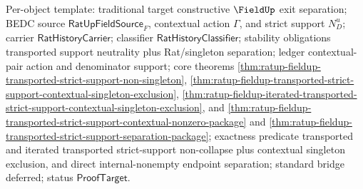 Per-object template: traditional target constructive $\FieldUp$ exit separation;
BEDC source $\mathsf{RatUpFieldSource}_F$, contextual action $\Gamma$, and
strict support $N_D^u$; carrier $\mathsf{RatHistoryCarrier}$; classifier
$\mathsf{RatHistoryClassifier}$; stability obligations transported support
neutrality plus Rat/singleton separation; ledger contextual-pair action and
denominator support; core theorems
\autoref{thm:ratup-fieldup-transported-strict-support-non-singleton},
\autoref{thm:ratup-fieldup-transported-strict-support-contextual-singleton-exclusion},
\autoref{thm:ratup-fieldup-iterated-transported-strict-support-contextual-singleton-exclusion},
and
\autoref{thm:ratup-fieldup-transported-strict-support-contextual-nonzero-package}
and
\autoref{thm:ratup-fieldup-transported-strict-support-separation-package};
exactness predicate transported and iterated transported strict-support
non-collapse plus contextual singleton exclusion, and direct internal-nonempty
endpoint separation; standard bridge deferred; status $\mathsf{ProofTarget}$.

